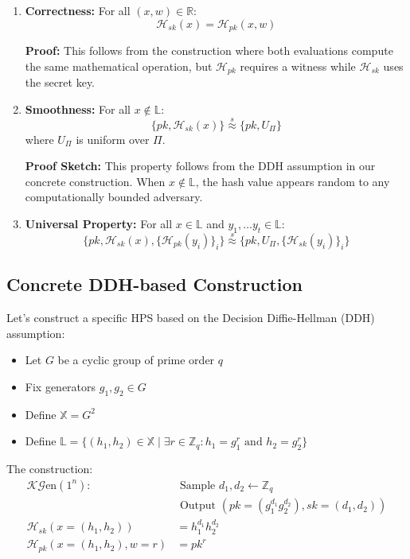 \begin{enumerate}
    \item \textbf{Correctness:} For all $(x,w) \in \mathbb{R}$:
    \[ \mathcal{H}_{sk}(x) = \mathcal{H}_{pk}(x,w) \]
    
    \textbf{Proof:}
    This follows from the construction where both evaluations compute the same mathematical operation, but $\mathcal{H}_{pk}$ requires a witness while $\mathcal{H}_{sk}$ uses the secret key.

    \item \textbf{Smoothness:} For all $x \not\in \mathbb{L}$:
    \[ \{pk, \mathcal{H}_{sk}(x)\} \stackrel{s}{\approx} \{pk, U_\Pi\} \]
    where $U_\Pi$ is uniform over $\Pi$.
    
    \textbf{Proof Sketch:}
    This property follows from the DDH assumption in our concrete construction. When $x \not\in \mathbb{L}$, the hash value appears random to any computationally bounded adversary.

    \item \textbf{Universal Property:} For all $x \in \mathbb{L}$ and $y_1, \ldots y_t \in \mathbb{L}$:
    \[ \{pk, \mathcal{H}_{sk}(x), \{\mathcal{H}_{pk}(y_i)\}_i\} \stackrel{s}{\approx} \{pk, U_\Pi, \{\mathcal{H}_{sk}(y_i)\}_i\} \]
\end{enumerate}

\subsection{Concrete DDH-based Construction}

Let's construct a specific HPS based on the Decision Diffie-Hellman (DDH) assumption:

\begin{itemize}
    \item Let $G$ be a cyclic group of prime order $q$
    \item Fix generators $g_1, g_2 \in G$
    \item Define $\mathbb{X} = G^2$
    \item Define $\mathbb{L} = \{(h_1,h_2) \in \mathbb{X} \mid \exists r \in \mathbb{Z}_q: h_1=g_1^r \text{ and } h_2=g_2^r\}$
\end{itemize}

The construction:
\begin{align*}
    \mathcal{K}\mathcal{G}\text{en}(1^n): &\text{ Sample } d_1,d_2 \gets \mathbb{Z}_q \\
    &\text{ Output } (pk=(g_1^{d_1}g_2^{d_2}), sk=(d_1,d_2)) \\
    \mathcal{H}_{sk}(x=(h_1,h_2)) &= h_1^{d_1}h_2^{d_2} \\
    \mathcal{H}_{pk}(x=(h_1,h_2),w=r) &= pk^r
\end{align*}

